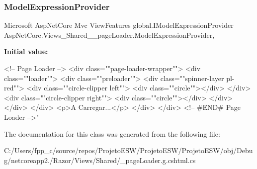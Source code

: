 \subsubsection{\texorpdfstring{Model\+Expression\+Provider}{ModelExpressionProvider}}
{\footnotesize\ttfamily Microsoft Asp\+Net\+Core Mvc View\+Features global.\+I\+Model\+Expression\+Provider Asp\+Net\+Core.\+Views\+\_\+\+Shared\+\_\+\+\_\+page\+Loader.\+Model\+Expression\+Provider\hspace{0.3cm}{\ttfamily [get]}, {}}

{\bfseries Initial value\+:}
\begin{DoxyCode}
<!-- Page Loader -->
<div \textcolor{keyword}{class}=\textcolor{stringliteral}{""}page-loader-wrapper\textcolor{stringliteral}{""}>
    <div \textcolor{keyword}{class}=\textcolor{stringliteral}{""}loader\textcolor{stringliteral}{""}>
        <div \textcolor{keyword}{class}=\textcolor{stringliteral}{""}preloader\textcolor{stringliteral}{""}>
            <div \textcolor{keyword}{class}=\textcolor{stringliteral}{""}spinner-layer pl-red\textcolor{stringliteral}{""}>
                <div \textcolor{keyword}{class}=\textcolor{stringliteral}{""}circle-clipper left\textcolor{stringliteral}{""}>
                    <div \textcolor{keyword}{class}=\textcolor{stringliteral}{""}circle\textcolor{stringliteral}{""}></div>
                </div>
                <div \textcolor{keyword}{class}=\textcolor{stringliteral}{""}circle-clipper right\textcolor{stringliteral}{""}>
                    <div \textcolor{keyword}{class}=\textcolor{stringliteral}{""}circle\textcolor{stringliteral}{""}></div>
                </div>
            </div>
        </div>
        <p>A Carregar...</p>
    </div>
</div>
<!-- #END# Page Loader -->\textcolor{stringliteral}{"}
\end{DoxyCode}


The documentation for this class was generated from the following file\+:\begin{DoxyCompactItemize}
\item 
C\+:/\+Users/fpp\+\_\+c/source/repos/\+Projeto\+E\+S\+W/\+Projeto\+E\+S\+W/\+Projeto\+E\+S\+W/obj/\+Debug/netcoreapp2./\+Razor/\+Views/\+Shared/\+\_\+page\+Loader.\+g.\+cshtml.\+cs\end{DoxyCompactItemize}

